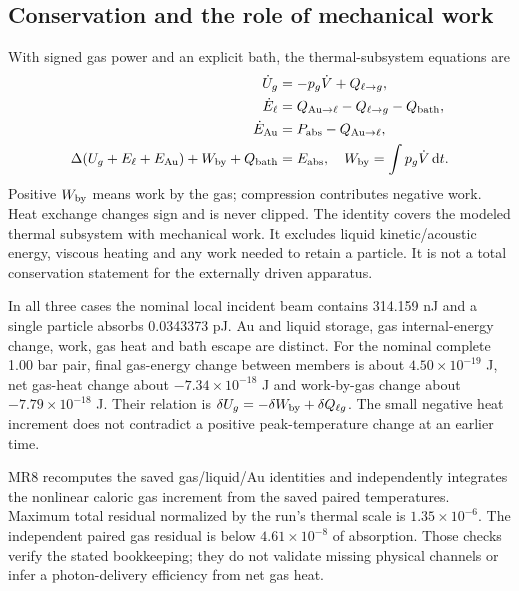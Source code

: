 \documentclass[11pt,a4paper]{article}
\newcommand{\dd}{\mathrm d}
\begin{document}
\subsection{Conservation and the role of mechanical work}
With signed gas power and an explicit bath, the thermal-subsystem equations are
\begin{align}
\dot U_g&=-p_g\dot V+Q_{\ell\to g},\\
\dot E_\ell&=Q_{{\rm Au}\to\ell}-Q_{\ell\to g}-Q_{\rm bath},\\
\dot E_{\rm Au}&=P_{\rm abs}-Q_{{\rm Au}\to\ell},\\
\Delta(U_g+E_\ell+E_{\rm Au})+W_{\rm by}+Q_{\rm bath}&=E_{\rm abs},\quad
W_{\rm by}=\int p_g\dot V\,\dd t.
\end{align}
Positive $W_{\rm by}$ means work by the gas; compression contributes negative work. Heat exchange changes sign and is never clipped. The identity covers the modeled thermal subsystem with mechanical work. It excludes liquid kinetic/acoustic energy, viscous heating and any work needed to retain a particle. It is not a total conservation statement for the externally driven apparatus.
\begin{table}[H]\centering\scriptsize
\caption{Inherited thermal energies independently reassembled in MR8, in pJ, at each run's endpoint. These include the acoustic background; they are not all laser-tagged energies. The 1.30* endpoint is censored at 18.5453 $\mu$s, whereas the other endpoints are 166.667 $\mu$s.}

\end{table}
In all three cases the nominal local incident beam contains 314.159 nJ and a single particle absorbs 0.0343373 pJ. Au and liquid storage, gas internal-energy change, work, gas heat and bath escape are distinct. For the nominal complete 1.00 bar pair, final gas-energy change between members is about $4.50\times10^{-19}$ J, net gas-heat change about $-7.34\times10^{-18}$ J and work-by-gas change about $-7.79\times10^{-18}$ J. Their relation is $\delta U_g=-\delta W_{\rm by}+\delta Q_{\ell g}$. The small negative heat increment does not contradict a positive peak-temperature change at an earlier time.

MR8 recomputes the saved gas/liquid/Au identities and independently integrates the nonlinear caloric gas increment from the saved paired temperatures. Maximum total residual normalized by the run's thermal scale is $1.35\times10^{-6}$. The independent paired gas residual is below $4.61\times10^{-8}$ of absorption. Those checks verify the stated bookkeeping; they do not validate missing physical channels or infer a photon-delivery efficiency from net gas heat.
\clearpage
\end{document}
